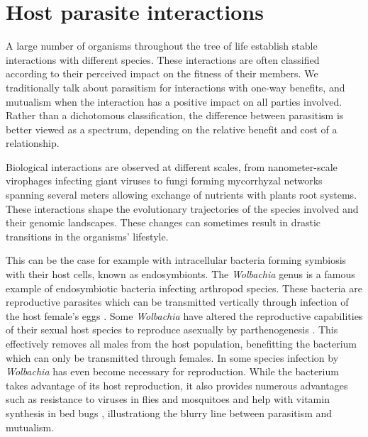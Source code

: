 
\chapter{Host parasite interactions} %

\label{ch:01-01} %


A large number of organisms throughout the tree of life establish stable interactions with different species. These interactions are often classified according to their perceived impact on the fitness of their members. We traditionally talk about parasitism for interactions with one-way benefits, and mutualism when the interaction has a positive impact on all parties involved. Rather than a dichotomous classification, the difference between parasitism is better viewed as a spectrum, depending on the relative benefit and cost of a relationship.

Biological interactions are observed at different scales, from nanometer-scale virophages infecting giant viruses to fungi forming mycorrhyzal networks spanning several meters \citep{Johnson1997,Selosse2006} allowing exchange of nutrients with plants root systems. These interactions shape the evolutionary trajectories of the species involved and their genomic landscapes. These changes can sometimes result in drastic transitions in the organisms' lifestyle. 

This can be the case for example with intracellular bacteria forming symbiosis with their host cells, known as endosymbionts. The \textit{Wolbachia} genus is a famous example of endosymbiotic bacteria infecting arthropod species. These bacteria are reproductive parasites which can be transmitted vertically through infection of the host female's eggs \cite{Knight2001}. Some \textit{Wolbachia} have altered the reproductive capabilities of their sexual host species to reproduce asexually by \Gls{parthenogenesis} \cite{Stouthamer1993}. This effectively removes all males from the host population, benefitting the bacterium which can only be transmitted through females. In some species infection by \textit{Wolbachia} has even become necessary for reproduction. While the bacterium takes advantage of its host reproduction, it also provides numerous advantages such as resistance to viruses in flies and mosquitoes \citep{Hedges2008,Teixeira2008} and help with vitamin synthesis in bed bugs \cite{Nikoh2014}, illustrationg the blurry line between parasitism and mutualism.

